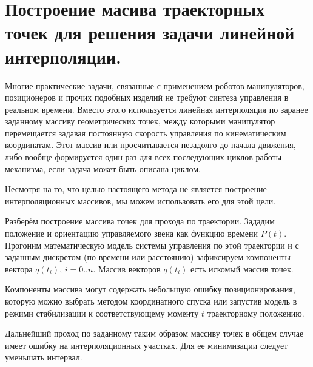 \section{Построение масива траекторных точек для решения задачи линейной интерполяции.}

Многие практические задачи, связанные с применением роботов манипуляторов, позиционеров и прочих подобных изделий не требуют синтеза управления в реальном времени. Вместо этого используется линейная интерполяция по заранее заданному массиву геометрических точек, между которыми манипулятор перемещается задавая постоянную скорость управления по кинематическим координатам. Этот массив или просчитывается незадолго до начала движения, либо вообще формируется один раз для всех последующих циклов работы механизма, если задача может быть описана циклом.

Несмотря на то, что целью настоящего метода не является построение интерполяционных массивов, мы можем использовать его для этой цели.

Разберём построение массива точек для прохода по траектории. Зададим положение и ориентацию управляемого звена как функцию времени $P(t)$. Прогоним математическую модель системы управления по этой траектории и с заданным дискретом (по времени или расстоянию) зафиксируем компоненты вектора $q(t_i)$, $i=0..n$. Массив векторов $q(t_i)$ есть искомый массив точек.

Компоненты массива могут содержать небольшую ошибку позиционирования, которую можно выбрать методом координатного спуска или запустив модель в режими стабилизации к соответствующему моменту $t$ траекторному положению.

Дальнейший проход по заданному таким образом массиву точек в общем случае имеет ошибку на интерполяционных участках. Для ее минимизации следует уменьшать интервал.